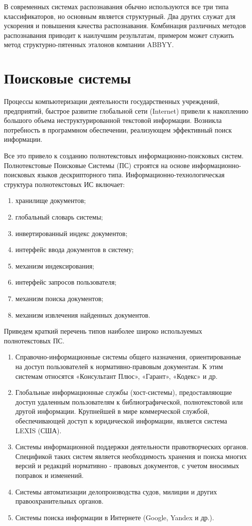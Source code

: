\begin{table}[]
\end{table}

В современных системах распознавания обычно используются все три типа
классификаторов, но основным является структурный. Два других служат для
ускорения и повышения качества распознавания. Комбинация различных методов
распознавания приводит к наилучшим результатам, примером может служить метод
структурно-пятенных эталонов компании ABBYY.


\section{Поисковые системы}
Процессы компьютеризации деятельности государственных учреждений, предприятий, быстрое развитие глобальной сети (Internet) привели к накоплению большого объема неструктурированной текстовой информации. Возникла потребность в программном обеспечении, реализующем эффективный поиск информации.

Все это привело к созданию полнотекстовых информационно-поисковых систем. Полнотекстовые Поисковые Системы (ПС)  строятся на основе информационно-поисковых языков дескрипторного типа. Информационно-технологическая структура полнотекстовых ИС включает:
\begin{enumerate}
	\item хранилище документов; 
	\item глобальный словарь системы; 
	\item инвертированный индекс документов; 
	\item интерфейс ввода документов в систему; 
	\item механизм индексирования; 
	\item интерфейс запросов пользователя; 
	\item механизм поиска документов; 
	\item механизм извлечения найденных документов.
\end{enumerate} 

Приведем краткий перечень типов наиболее широко используемых полнотекстовых ПС.
\begin{enumerate}
\item Справочно-информационные системы общего назначения, ориентированные на доступ пользователей к нормативно-правовым документам. К этим системам относятся «Консультант Плюс», «Гарант», «Кодекс» и др. 
\item Глобальные информационные службы (хост-системы), предоставляющие доступ удаленным пользователям к библиографической, полнотекстовой или другой информации. Крупнейшей в мире коммерческой службой, обеспечивающей доступ к юридической информации, является система LEXIS (США). 
\item Системы информационной поддержки деятельности правотворческих органов. Спецификой таких систем является необходимость хранения и поиска многих версий и редакций нормативно - правовых документов, с учетом вносимых поправок и изменений. 
\item Системы автоматизации делопроизводства судов, милиции и других правоохранительных органов.
\item Системы поиска информации в Интернете (Google, Yandex и др.).
\end{enumerate}

